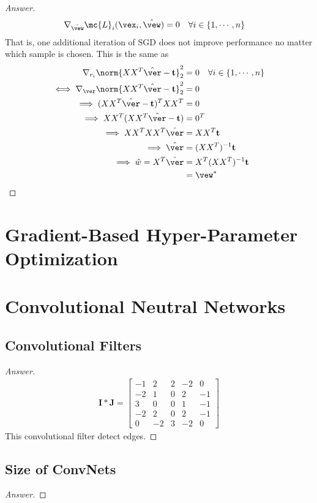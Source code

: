 \documentclass{article}
\begin{document}
\begin{proof}[Answer]
		\begin{align}
			\nabla_{\hat{\vew}} \mc{L}_i(\vex_i, \hat{\vew}) &= 0\quad \forall i \in \{1, \cdots, n\}
		\end{align}
		That is, one additional iteration of SGD does not improve performance no matter which sample is chosen. This is the same as
		\begin{align}
			\nabla_{r_i} \norm{X X^T \hat{\ver} - \textbf{t}}_2^2 &= 0\quad \forall i \in \{1, \cdots, n\} \\
			\iff \nabla_{\ver} \norm{X X^T \hat{\ver} - \textbf{t}}_2^2 &= 0 \\
			\implies (X X^T \hat{\ver} - \textbf{t})^T XX^T &= 0 \\
			\implies XX^T (X X^T \hat{\ver} - \textbf{t}) &= 0^T \\
			\implies XX^T XX^T \hat{\ver} &= XX^T \textbf{t} \\
			\implies \hat{\ver} &= (XX^T)^{-1} \textbf{t} \\
			\implies \hat{w} = X^T \hat{\ver} &= X^T (XX^T)^{-1} \textbf{t} \\
			&= \vew^*
		\end{align}
	\end{proof}

	\section{Gradient-Based Hyper-Parameter Optimization}
	
	\section{Convolutional Neutral Networks}
	\subsection{Convolutional Filters}
	\begin{proof}[Answer]
		\begin{align}
			\textbf{I} * \textbf{J}
			= \begin{bmatrix}
				-1 & 2 & 2 & -2 & 0 \\
				-2 & 1 & 0 & 2 & -1 \\
				3 & 0 & 0 & 1 & -1 \\
				-2 & 2 & 0 & 2 & -1 \\
				0 & -2 & 3 & -2 & 0
			\end{bmatrix}
		\end{align}
		This convolutional filter detect edges.
	\end{proof}
	
	\subsection{Size of ConvNets}
	\begin{proof}[Answer]
		
	\end{proof}
\end{document}

